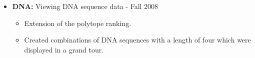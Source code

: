 \documentclass[oneside]{article}
\begin{document}
\begin{itemize}




\item{\bf DNA:} Viewing DNA sequence data - Fall 2008
\begin{itemize}
  \item Extension of the polytope ranking.
  \item Created combinations of DNA sequences with a length of four which were displayed in a grand tour.
\end{itemize}

%


\end{itemize}
\end{document}
